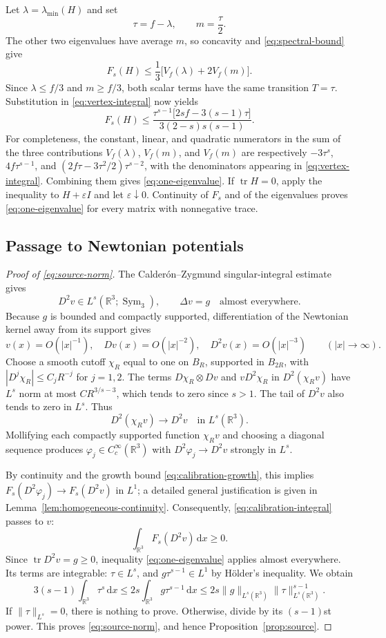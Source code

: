 \documentclass[11pt,a4paper,reqno]{amsart}
\theoremstyle{plain}
\theoremstyle{remark}
\numberwithin{equation}{section}
\newcommand{\R}{\mathbb R}
\newcommand{\dd}{\,\mathrm d}
\newcommand{\norm}[1]{\lVert#1\rVert}
\DeclareMathOperator{\tr}{tr}
\DeclareMathOperator{\Sym}{Sym}
\begin{document}
Let $\lambda=\lambda_{\min}(H)$ and set
\[
 \tau=f-\lambda,\qquad m=\frac\tau2.
\]
The other two eigenvalues have average $m$, so concavity and \eqref{eq:spectral-bound} give
\[
 F_s(H)\le\frac13\bigl[V_f(\lambda)+2V_f(m)\bigr].
\]
Since $\lambda\le f/3$ and $m\ge f/3$, both scalar terms have the same transition $T=\tau$. Substitution in \eqref{eq:vertex-integral} now yields
\begin{equation}\label{eq:one-eigenvalue}
 F_s(H)\le
 \frac{\tau^{s-1}\bigl[2sf-3(s-1)\tau\bigr]}
      {3(2-s)s(s-1)}.
\end{equation}
For completeness, the constant, linear, and quadratic numerators in the sum of the three contributions $V_f(\lambda)$, $V_f(m)$, and $V_f(m)$ are respectively $-3\tau^s$, $4f\tau^{s-1}$, and $(2f\tau-3\tau^2/2)\tau^{s-2}$, with the denominators appearing in \eqref{eq:vertex-integral}. Combining them gives \eqref{eq:one-eigenvalue}. If $\tr H=0$, apply the inequality to $H+\varepsilon I$ and let $\varepsilon\downarrow0$. Continuity of $F_s$ and of the eigenvalues proves \eqref{eq:one-eigenvalue} for every matrix with nonnegative trace.

\subsection{Passage to Newtonian potentials}
\begin{proof}[Proof of \eqref{eq:source-norm}]
The Calder\'on--Zygmund singular-integral estimate \cite{CZ1952} gives
\[
 D^2v\in L^s(\R^3;\Sym_3),\qquad \Delta v=g
 \quad\text{almost everywhere}.
\]
Because $g$ is bounded and compactly supported, differentiation of the Newtonian kernel away from its support gives
\[
 v(x)=O(|x|^{-1}),\quad Dv(x)=O(|x|^{-2}),\quad
 D^2v(x)=O(|x|^{-3})\qquad (|x|\to\infty).
\]
Choose a smooth cutoff $\chi_R$ equal to one on $B_R$, supported in $B_{2R}$, with $|D^j\chi_R|\le C_jR^{-j}$ for $j=1,2$. The terms $D\chi_R\otimes Dv$ and $vD^2\chi_R$ in $D^2(\chi_Rv)$ have $L^s$ norm at most $CR^{3/s-3}$, which tends to zero since $s>1$. The tail of $D^2v$ also tends to zero in $L^s$. Thus
\[
 D^2(\chi_Rv)\longrightarrow D^2v\quad\text{in }L^s(\R^3).
\]
Mollifying each compactly supported function $\chi_Rv$ and choosing a diagonal sequence produces $\varphi_j\in C_c^\infty(\R^3)$ with $D^2\varphi_j\to D^2v$ strongly in $L^s$.

By continuity and the growth bound \eqref{eq:calibration-growth}, this implies $F_s(D^2\varphi_j)\to F_s(D^2v)$ in $L^1$; a detailed general justification is given in Lemma~\ref{lem:homogeneous-continuity}. Consequently, \eqref{eq:calibration-integral} passes to $v$:
\[
 \int_{\R^3}F_s(D^2v)\dd x\ge0.
\]
Since $\tr D^2v=g\ge0$, inequality \eqref{eq:one-eigenvalue} applies almost everywhere. Its terms are integrable: $\tau\in L^s$, and $g\tau^{s-1}\in L^1$ by H\"older's inequality. We obtain
\[
 3(s-1)\int_{\R^3}\tau^s\dd x
 \le2s\int_{\R^3}g\tau^{s-1}\dd x
 \le2s\norm{g}_{L^s(\R^3)}\norm{\tau}_{L^s(\R^3)}^{s-1}.
\]
If $\norm\tau_{L^s}=0$, there is nothing to prove. Otherwise, divide by its $(s-1)$st power. This proves \eqref{eq:source-norm}, and hence Proposition~\ref{prop:source}.
\end{proof}
\end{document}
